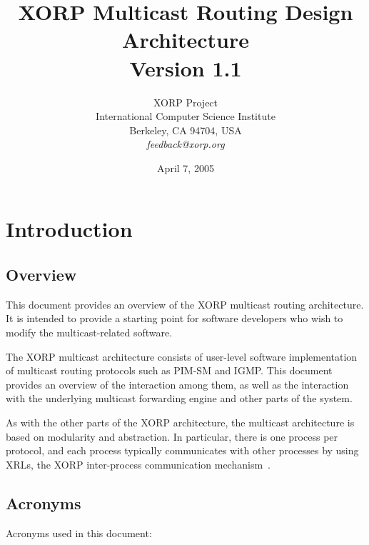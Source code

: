 \documentclass[11pt]{article}
\begin{document}
\title{XORP Multicast Routing Design Architecture \\
\vspace{1ex}
Version 1.1}
\author{ XORP Project					\\
	 International Computer Science Institute	\\
	 Berkeley, CA 94704, USA			\\
	 {\it feedback@xorp.org}
}
\date{April 7, 2005}

\maketitle

\thispagestyle{empty}


\section{Introduction}


\subsection{Overview}

This document provides an overview of the XORP multicast routing
architecture.  It is intended to provide a starting point for software
developers who wish to modify the multicast-related software.

The XORP multicast architecture consists of user-level software
implementation of multicast routing protocols such as PIM-SM and IGMP.
This document provides an overview of the interaction among them,
as well as the interaction with the underlying multicast forwarding
engine and other parts of the system.

As with the other parts of the XORP architecture, the multicast
architecture is based on modularity and abstraction.
In particular, there is one process per protocol, and each process
typically communicates with other processes by using XRLs, the XORP
inter-process communication mechanism~\cite{xorp:xrl}.

\subsection{Acronyms}

Acronyms used in this document:
\end{document}
